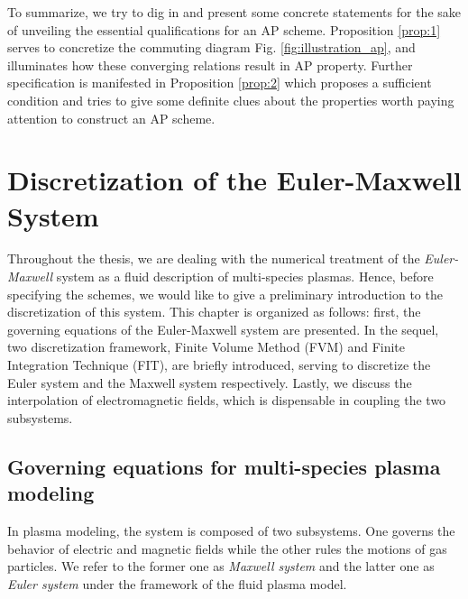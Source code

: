 \documentclass{report}
\begin{document}
To summarize, we try to dig in and present some concrete statements for the sake of unveiling the essential qualifications for an AP scheme. Proposition \ref{prop:1} serves to concretize the commuting diagram Fig. \ref{fig:illustration_ap}, and illuminates how these converging relations result in AP property. Further specification is manifested in Proposition \ref{prop:2} which proposes a sufficient condition and tries to give some definite clues about the properties worth paying attention to construct an AP scheme.             
\chapter{Discretization of the Euler-Maxwell System} \label{chap:discretization_euler_maxwell}
Throughout the thesis, we are dealing with the numerical treatment of the \emph{Euler-Maxwell} system as a fluid description of multi-species plasmas. Hence, before specifying the schemes, we would like to give a preliminary introduction to the discretization of this system. This chapter is organized as follows: first, the governing equations of the Euler-Maxwell system are presented. In the sequel, two discretization framework, Finite Volume Method (FVM) and Finite Integration Technique (FIT), are briefly introduced, serving to discretize the Euler system and the Maxwell system respectively. Lastly, we discuss the interpolation of electromagnetic fields, which is dispensable in coupling the two subsystems. 

\section{Governing equations for multi-species plasma modeling}
In plasma modeling, the system is composed of two subsystems. One governs the behavior of electric and magnetic fields while the other rules the motions of gas particles. We refer to the former one as \emph{Maxwell system} and the latter one as \emph{Euler system} under the framework of the fluid plasma model.
\end{document}
